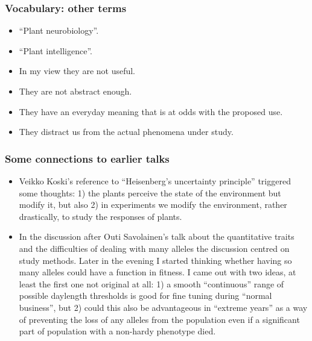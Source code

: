 \documentclass[10pt]{beamer}\usepackage[]{graphicx}\usepackage[]{xcolor}
\begin{document}
\begin{frame}[allowframebreaks,t]
\printbibliography
\end{frame}

\begin{frame}%
  \frametitle{Vocabulary: other terms}
  \begin{itemize}
    \item ``Plant neurobiology''.
    \item ``Plant intelligence''.
    \item In my view they are not useful.
    \item They are not abstract enough.
    \item They have an everyday meaning that is at odds with the proposed use.
    \item They distract us from the actual phenomena under study.
  \end{itemize}
\end{frame}

\begin{frame}
  \frametitle{Some connections to earlier talks}
  \begin{itemize}
    \item Veikko Koski's reference to ``Heisenberg's uncertainty principle'' triggered some thoughts: 1) the plants perceive the state of the environment but modify it, but also 2) in experiments we modify the environment, rather drastically, to study the responses of plants.
    \item In the discussion after Outi Savolainen's talk about the quantitative traits and the difficulties of dealing with many alleles the discussion centred on study methods. Later in the evening I started thinking whether having so many alleles could have a function in fitness. I came out with two ideas, at least the first one not original at all: 1) a smooth ``continuous'' range of possible daylength thresholds is good for fine tuning during ``normal business'', but 2) could this also be advantageous in ``extreme years'' as a way of preventing the loss of any alleles from the population even if a significant part of population with a non-hardy phenotype died.
  \end{itemize}
\end{frame}
\end{document}
